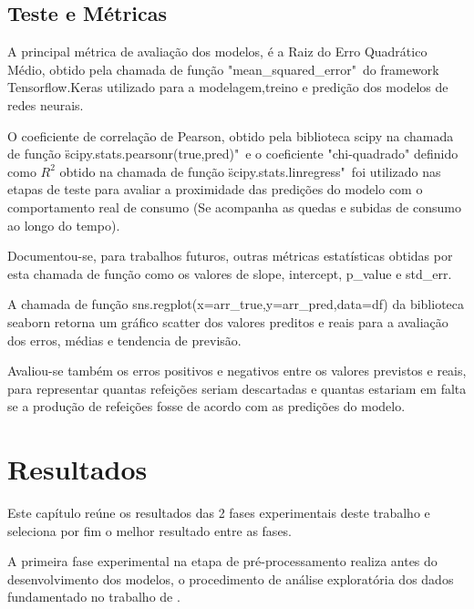 \documentclass[	12pt, Times, openright, twoside, a4paper, english, brazil]{abntex2}
\begin{document}
    \section{Teste e Métricas}
       A principal métrica de avaliação dos modelos, é a Raiz do Erro Quadrático Médio, obtido pela chamada de função "mean\_squared\_error"\ do framework Tensorflow.Keras utilizado para a modelagem,treino e predição dos modelos de redes neurais.
       
        O coeficiente de correlação de Pearson, obtido pela biblioteca scipy na chamada de função \"scipy.stats.pearsonr(true,pred)"\ e o coeficiente "chi-quadrado" definido como $R^2$ obtido na chamada de função \"scipy.stats.linregress"\ foi utilizado nas etapas de teste para avaliar a proximidade das predições do modelo com o comportamento real de consumo (Se acompanha as quedas e subidas de consumo ao longo do tempo).\newline
       
        Documentou-se, para trabalhos futuros, outras métricas estatísticas obtidas por esta chamada de função como os valores de slope, intercept, p\_value e std\_err.\newline
       
        A chamada de função sns.regplot(x=arr\_true,y=arr\_pred,data=df) da biblioteca seaborn  retorna um gráfico scatter dos valores preditos e reais para a avaliação dos erros, médias e tendencia de previsão.\newline 
       
       Avaliou-se também os erros positivos e negativos entre os valores previstos e reais, para representar quantas refeições seriam descartadas e quantas estariam em falta se a produção de refeições fosse de acordo com as predições do modelo.
       
  \chapter{Resultados}
    Este capítulo reúne os resultados das 2 fases experimentais deste trabalho e seleciona por fim o melhor resultado entre as fases.
    
    A primeira fase experimental na etapa de pré-processamento realiza antes do desenvolvimento dos modelos, o procedimento de análise exploratória dos dados fundamentado no trabalho de \cite{Junior2007}.
    
\end{document}
